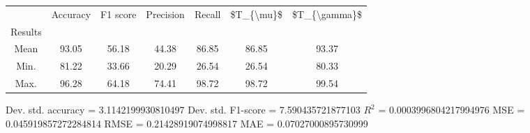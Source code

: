 \begin{tabular}{|c|c|c|c|c|c|c|}
\toprule
{} &  Accuracy &  F1 score &  Precision &  Recall &  \$T\_\{\textbackslash mu\}\$ &  \$T\_\{\textbackslash gamma\}\$ \\
Results &           &           &            &         &            &               \\
\hline
Mean    &     93.05 &     56.18 &      44.38 &   86.85 &      86.85 &         93.37 \\
Min.    &     81.22 &     33.66 &      20.29 &   26.54 &      26.54 &         80.33 \\
Max.    &     96.28 &     64.18 &      74.41 &   98.72 &      98.72 &         99.54 \\
\bottomrule
\end{tabular}

 Dev. std. accuracy = 3.1142199930810497
 Dev. std. F1-score = 7.590435721877103
 $R^2$ = 0.0003996804217994976
 MSE = 0.045919857272284814
 RMSE = 0.21428919074998817
 MAE = 0.07027000895730999